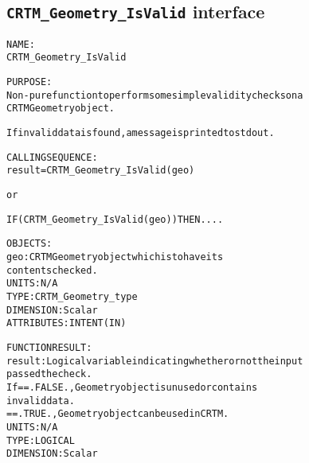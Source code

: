 \subsection{\texttt{CRTM\_Geometry\_IsValid} interface}
  \label{sec:CRTM_Geometry_IsValid_interface}
  \begin{alltt}
 
  NAME:
        CRTM_Geometry_IsValid
 
  PURPOSE:
        Non-pure function to perform some simple validity checks on a
        CRTM Geometry object. 
 
        If invalid data is found, a message is printed to stdout.
 
  CALLING SEQUENCE:
        result = CRTM_Geometry_IsValid( geo )
 
          or
 
        IF ( CRTM_Geometry_IsValid( geo ) ) THEN....
 
  OBJECTS:
        geo:       CRTM Geometry object which is to have its
                   contents checked.
                   UNITS:      N/A
                   TYPE:       CRTM_Geometry_type
                   DIMENSION:  Scalar
                   ATTRIBUTES: INTENT(IN)
 
  FUNCTION RESULT:
        result:    Logical variable indicating whether or not the input
                   passed the check.
                   If == .FALSE., Geometry object is unused or contains
                                  invalid data.
                      == .TRUE.,  Geometry object can be used in CRTM.
                   UNITS:      N/A
                   TYPE:       LOGICAL
                   DIMENSION:  Scalar
 
  \end{alltt}
